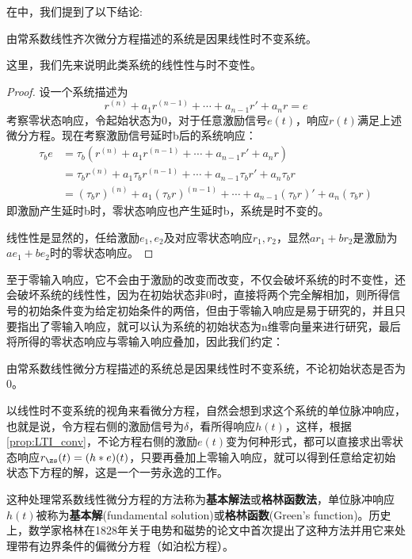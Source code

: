 在中，我们提到了以下结论:

\begin{proposition}
    由常系数线性齐次微分方程描述的系统是因果线性时不变系统。
\end{proposition}
这里，我们先来说明此类系统的线性性与时不变性。
\begin{proof}
    设一个系统描述为
\[r^{(n)}+a_{1}r^{(n-1)}+\cdots +a_{n-1} r'+a_n r=e\]
考察零状态响应，令起始状态为0，对于任意激励信号$e(t)$，响应$r(t)$满足上述微分方程。现在考察激励信号延时b后的系统响应：
\begin{align*}
    \tau_b e&=\tau_b(r^{(n)}+a_{1}r^{(n-1)}+\cdots +a_{n-1} r'+a_n r)\\
    &=\tau_b r^{(n)}+a_{1}\tau_b r^{(n-1)}+\cdots +a_{n-1} \tau_b r'+a_n \tau_b r\\
    &= (\tau_b r)^{(n)}+a_{1}(\tau_b r)^{(n-1)}+\cdots +a_{n-1} (\tau_b r)'+a_n (\tau_b r)
\end{align*}
即激励产生延时b时，零状态响应也产生延时b，系统是时不变的。

线性性是显然的，任给激励$e_1,e_2$及对应零状态响应$r_1,r_2$，显然$ar_1+br_2$是激励为$ae_1+be_2$时的零状态响应。
\end{proof}
至于零输入响应，它不会由于激励的改变而改变，不仅会破坏系统的时不变性，还会破坏系统的线性性，因为在初始状态非0时，直接将两个完全解相加，则所得信号的初始条件变为给定初始条件的两倍，但由于零输入响应是易于研究的，并且只要指出了零输入响应，就可以认为系统的初始状态为n维零向量来进行研究，最后将所得的零状态响应与零输入响应叠加，因此我们约定：
\begin{definition}
    由常系数线性微分方程描述的系统总是因果线性时不变系统，不论初始状态是否为0。
\end{definition}

以线性时不变系统的视角来看微分方程，自然会想到求这个系统的单位脉冲响应，也就是说，令方程右侧的激励信号为$\delta$，看所得响应$h(t)$，这样，根据\cref{prop:LTI_conv}，不论方程右侧的激励$e(t)$变为何种形式，都可以直接求出零状态响应$r_{\zs}(t)=(h*e)(t)$，只要再叠加上零输入响应，就可以得到任意给定初始状态下方程的解，这是一个一劳永逸的工作。

这种处理常系数线性微分方程的方法称为\textbf{基本解法}或\textbf{格林函数法}，单位脉冲响应$h(t)$被称为\textbf{基本解}(fundamental solution)或\textbf{格林函数}(Green's function)。历史上，数学家格林在1828年关于电势和磁势的论文中首次提出了这种方法并用它来处理带有边界条件的偏微分方程（如泊松方程）。

